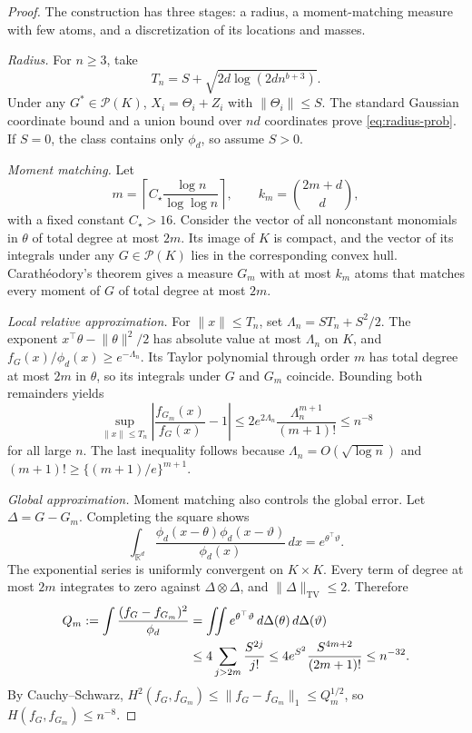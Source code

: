 \documentclass[11pt]{article}
\theoremstyle{definition}
\theoremstyle{remark}
\DeclareMathOperator{\TV}{TV}
\newcommand{\Pcal}{\mathcal P}
\newcommand{\RR}{\mathbb R}
\newcommand{\norm}[1]{\lVert #1\rVert}
\begin{document}
\begin{proof}
The construction has three stages: a radius, a moment-matching measure with
few atoms, and a discretization of its locations and masses.

\emph{Radius.}  For $n\ge3$, take
\[
 T_n=S+\sqrt{2d\log(2d n^{b+3})}.
\]
Under any $G^*\in\Pcal(K)$, $X_i=\Theta_i+Z_i$ with $\norm{\Theta_i}\le S$.
The standard Gaussian coordinate bound and a union bound over $nd$
coordinates prove \eqref{eq:radius-prob}.  If $S=0$, the class contains only
$\phi_d$, so assume $S>0$.

\emph{Moment matching.}  Let
\[
 m=\left\lceil C_\star\frac{\log n}{\log\log n}\right\rceil,
 \qquad k_m=\binom{2m+d}{d},
\]
with a fixed constant $C_\star>16$.  Consider the vector of all nonconstant
monomials in $\theta$ of total degree at most $2m$.  Its image of $K$ is
compact, and the vector of its integrals under any $G\in\Pcal(K)$ lies in
the corresponding convex hull.  Carath\'eodory's theorem gives a measure
$G_m$ with at most $k_m$ atoms that matches every moment of $G$ of total
degree at most $2m$.

\emph{Local relative approximation.}  For $\norm{x}\le T_n$, set
$\Lambda_n=ST_n+S^2/2$.  The exponent $x^\top\theta-\norm{\theta}^2/2$ has
absolute value at most $\Lambda_n$ on $K$, and
$f_G(x)/\phi_d(x)\ge e^{-\Lambda_n}$.  Its Taylor polynomial through order
$m$ has total degree at most $2m$ in $\theta$, so its integrals under $G$ and
$G_m$ coincide.  Bounding both remainders yields
\begin{equation}\label{eq:relative-approx}
 \sup_{\norm{x}\le T_n}
 \left|\frac{f_{G_m}(x)}{f_G(x)}-1\right|
 \le2e^{2\Lambda_n}\frac{\Lambda_n^{m+1}}{(m+1)!}\le n^{-8}
\end{equation}
for all large $n$.  The last inequality follows because
$\Lambda_n=O(\sqrt{\log n})$ and $(m+1)!\ge\{(m+1)/e\}^{m+1}$.

\emph{Global approximation.}  Moment matching also controls the global
error.  Let $\Delta=G-G_m$.  Completing the square shows
\[
 \int_{\RR^d}
 \frac{\phi_d(x-\theta)\phi_d(x-\vartheta)}{\phi_d(x)}\,dx
 =e^{\theta^\top\vartheta}.
\]
The exponential series is uniformly convergent on $K\times K$.  Every term
of degree at most $2m$ integrates to zero against $\Delta\otimes\Delta$, and
$\norm{\Delta}_{\TV}\le2$.  Therefore
\begin{align}
 Q_m:=\int\frac{(f_G-f_{G_m})^2}{\phi_d}
 &=\iint e^{\theta^\top\vartheta}\,d\Delta(\theta)\,d\Delta(\vartheta)\notag\\
 &\le4\sum_{j>2m}\frac{S^{2j}}{j!}
 \le4e^{S^2}\frac{S^{4m+2}}{(2m+1)!}\le n^{-32}.
 \label{eq:Qm}
\end{align}
By Cauchy--Schwarz,
$H^2(f_G,f_{G_m})\le\norm{f_G-f_{G_m}}_1\le Q_m^{1/2}$, so
$H(f_G,f_{G_m})\le n^{-8}$.


\end{proof}
\end{document}
